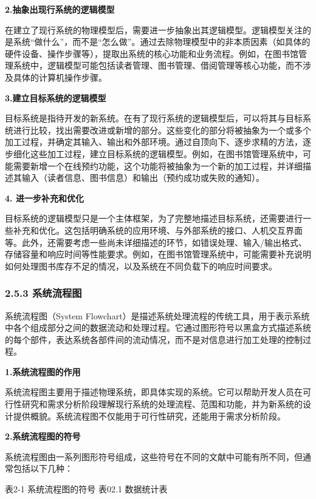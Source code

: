 \textbf{2.抽象出现行系统的逻辑模型}

在建立了现行系统的物理模型后，需要进一步抽象出其逻辑模型。逻辑模型关注的是系统``做什么''，而不是``怎么做''。通过去除物理模型中的非本质因素（如具体的硬件设备、操作步骤等），提取出系统的核心功能和业务流程。例如，在图书馆管理系统中，逻辑模型可能包括读者管理、图书管理、借阅管理等核心功能，而不涉及具体的计算机操作步骤。

\textbf{3.建立目标系统的逻辑模型}

目标系统是指待开发的新系统。在有了现行系统的逻辑模型后，可以将其与目标系统进行比较，找出需要改进或新增的部分。这些变化的部分将被抽象为一个或多个加工过程，并确定其输入、输出和外部环境。通过自顶向下、逐步求精的方法，逐步细化这些加工过程，建立目标系统的逻辑模型。例如，在图书馆管理系统中，可能需要新增一个在线预约功能，这个功能将被抽象为一个新的加工过程，并详细描述其输入（读者信息、图书信息）和输出（预约成功或失败的通知）。

\textbf{4. 进一步补充和优化}

目标系统的逻辑模型只是一个主体框架，为了完整地描述目标系统，还需要进行一些补充和优化。这包括明确系统的应用环境、与外部系统的接口、人机交互界面等。此外，还需要考虑一些尚未详细描述的环节，如错误处理、输入/输出格式、存储容量和响应时间等性能要求。例如，在图书馆管理系统中，可能需要补充说明如何处理图书库存不足的情况，以及系统在不同负载下的响应时间要求。

\subsubsection{2.5.3 系统流程图}\label{ux7cfbux7edfux6d41ux7a0bux56fe}

系统流程图（System Flowchart）是描述系统处理流程的传统工具，用于表示系统中各个组成部分之间的数据流动和处理过程。它通过图形符号以黑盒方式描述系统的每个部件，表达系统各部件间的流动情况，而不是对信息进行加工处理的控制过程。

\textbf{1.系统流程图的作用}

系统流程图主要用于描述物理系统，即具体实现的系统。它可以帮助开发人员在可行性研究和需求分析阶段理解现行系统的处理流程、范围和功能，并为新系统的设计提供概貌。系统流程图不仅能用于可行性研究，还能用于需求分析阶段。

\textbf{2.系统流程图的符号}

系统流程图由一系列图形符号组成，这些符号在不同的文献中可能有所不同，但通常包括以下几种：

表2-1 系统流程图的符号 表02.1 数据统计表

